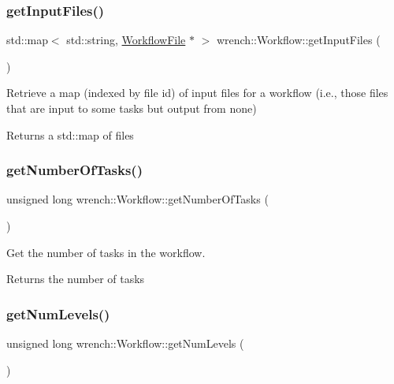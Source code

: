\subsubsection{\texorpdfstring{get\+Input\+Files()}{getInputFiles()}}
{\footnotesize\ttfamily std\+::map$<$ std\+::string, \hyperlink{classwrench_1_1_workflow_file}{Workflow\+File} $\ast$ $>$ wrench\+::\+Workflow\+::get\+Input\+Files (\begin{DoxyParamCaption}{ }\end{DoxyParamCaption})}



Retrieve a map (indexed by file id) of input files for a workflow (i.\+e., those files that are input to some tasks but output from none) 

\begin{DoxyReturn}{Returns}
a std\+::map of files 
\end{DoxyReturn}
\mbox{\label{classwrench_1_1_workflow_ab2b98a21d67824c2fc17cdc71c7e3909}} 
\subsubsection{\texorpdfstring{get\+Number\+Of\+Tasks()}{getNumberOfTasks()}}
{\footnotesize\ttfamily unsigned long wrench\+::\+Workflow\+::get\+Number\+Of\+Tasks (\begin{DoxyParamCaption}{ }\end{DoxyParamCaption})}



Get the number of tasks in the workflow. 

\begin{DoxyReturn}{Returns}
the number of tasks 
\end{DoxyReturn}
\mbox{\label{classwrench_1_1_workflow_a15f12b7d5088e8e1e2130545c2b795ea}} 
\subsubsection{\texorpdfstring{get\+Num\+Levels()}{getNumLevels()}}
{\footnotesize\ttfamily unsigned long wrench\+::\+Workflow\+::get\+Num\+Levels (\begin{DoxyParamCaption}{ }\end{DoxyParamCaption})}



